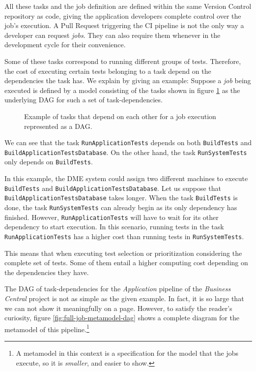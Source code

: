 All these tasks and the job definition are defined within the same
Version Control repository as code, giving the application developers complete 
control over the job's execution. A Pull Request triggering the CI pipeline is not the only way 
a developer can request \emph{jobs}. They can also require them whenever in the development 
cycle for their convenience.

Some of these tasks correspond to running different groups of tests. Therefore, the cost of executing 
certain tests belonging to a task depend on the dependencies the task has.
We explain by giving an example: Suppose a \emph{job} being executed 
is defined by a model consisting of the tasks shown in figure \ref{fig:example-dag-tasks} as the 
underlying DAG for such a set of task-dependencies. 

\begin{figure}
    \def\svgwidth{\columnwidth}
    
    \caption{Example of tasks that depend on each other for a job execution represented as a DAG.}
    \label{fig:example-dag-tasks}
\end{figure}

We can see that the task \texttt{RunApplicationTests} depends on both \texttt{BuildTests}
and \texttt{BuildApplicationTestsDatabase}. On the other hand, the task 
\texttt{RunSystemTests} only depends on \texttt{BuildTests}.

In this example, the DME system could assign two different machines to execute 
\texttt{BuildTests} and \texttt{BuildApplicationTestsDatabase}. Let us suppose that
\texttt{BuildApplicationTestsDatabase} takes longer. When the task \texttt{BuildTests}
is done, the task \texttt{RunSystemTests} can already begin as its only dependency
has finished. However, \texttt{RunApplicationTests} will have to wait for its other
dependency to start execution. In this scenario, running tests in the task \texttt{RunApplicationTests}
has a higher cost than running tests in \texttt{RunSystemTests}.

This means that when executing test selection or prioritization considering the complete
set of tests. Some of them entail a higher computing cost depending on the dependencies they
have.

The DAG of task-dependencies for the \emph{Application} pipeline of the \emph{Business Central} project is not as simple 
as the given example. In fact, it is so large that we can not show it meaningfully on a
page. However, to satisfy the reader's curiosity, figure \ref{fig:full-job-metamodel-dag} 
shows a complete diagram for the metamodel of this pipeline.\footnote{A 
metamodel in this context is a specification for the model that the jobs execute, so it is \textit{smaller}, and easier to show.}

